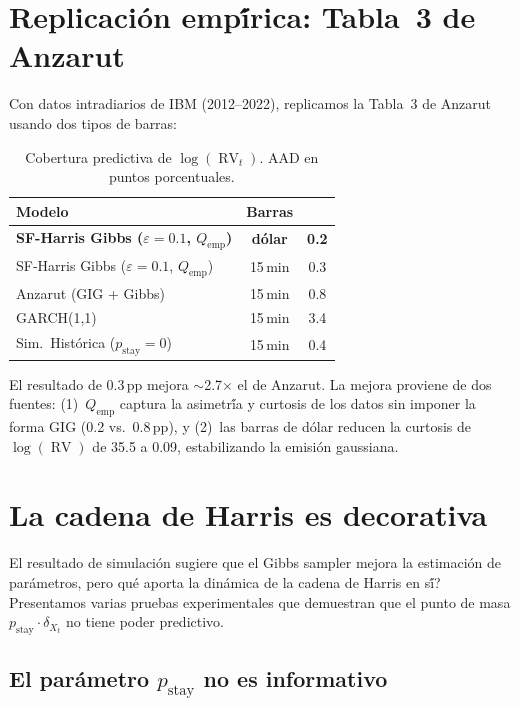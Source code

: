 \documentclass[12pt,letterpaper]{article}
\newcommand{\pstay}{p_{\text{stay}}}
\newcommand{\AAD}{\operatorname{AAD}}
\newcommand{\RV}{\operatorname{RV}}
\begin{document}
\section{Replicaci\'{o}n emp\'{\'i}rica: Tabla~3 de Anzarut}

Con datos intradiarios de IBM (2012--2022), replicamos la Tabla~3 de Anzarut usando dos tipos de barras:

\begin{table}[h]
\centering
\caption{Cobertura predictiva de $\log(\RV_t)$. AAD en puntos porcentuales.}
\label{tab:replicacion}
\begin{tabular}{lcc}
\toprule
Modelo & Barras & \AAD \\
\midrule
\textbf{SF-Harris Gibbs ($\varepsilon=0.1$, $Q_{\text{emp}}$)} & \textbf{d\'{o}lar} & \textbf{0.2} \\
SF-Harris Gibbs ($\varepsilon=0.1$, $Q_{\text{emp}}$) & 15\,min & 0.3 \\
Anzarut (GIG + Gibbs) & 15\,min & 0.8 \\
GARCH(1,1) & 15\,min & 3.4 \\
Sim.\ Hist\'{o}rica ($\pstay = 0$) & 15\,min & 0.4 \\
\bottomrule
\end{tabular}
\end{table}

El resultado de 0.3\,pp mejora $\sim$2.7$\times$ el de Anzarut. La mejora proviene de dos fuentes:
(1)~$Q_{\text{emp}}$ captura la asimetr\'{\'i}a y curtosis de los datos sin imponer la forma GIG (0.2 vs.\ 0.8\,pp), y
(2)~las barras de d\'{o}lar reducen la curtosis de $\log(\RV)$ de 35.5 a 0.09, estabilizando la emisi\'{o}n gaussiana.

\section{La cadena de Harris es decorativa}

El resultado de simulaci\'{o}n sugiere que el Gibbs sampler mejora la estimaci\'{o}n de par\'{a}metros, pero \texorpdfstring{\textquestiondown}{?}qu\'{e} aporta la din\'{a}mica de la cadena de Harris en s\'{\'i}? Presentamos varias pruebas experimentales que demuestran que el punto de masa $\pstay \cdot \delta_{X_t}$ no tiene poder predictivo.

\subsection{El par\'{a}metro $\pstay$ no es informativo}
\end{document}
